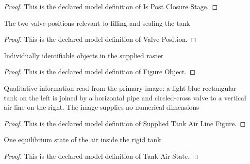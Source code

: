 \begin{proof}
  This is the declared model definition of Is Post Closure Stage.
\end{proof}
\begin{definition}
  \label{def:physics:phyx-mini-0443:phyxminiproblems-problemphyxmini0443-valveposition}
  The two valve positions relevant to filling and sealing the tank
\end{definition}
\begin{proof}
  This is the declared model definition of Valve Position.
\end{proof}
\begin{definition}
  \label{def:physics:phyx-mini-0443:phyxminiproblems-problemphyxmini0443-figureobject}
  Individually identifiable objects in the supplied raster
\end{definition}
\begin{proof}
  This is the declared model definition of Figure Object.
\end{proof}
\begin{definition}
  \label{def:physics:phyx-mini-0443:phyxminiproblems-problemphyxmini0443-suppliedtankairlinefigure}
  Qualitative information read from the primary image: a light-blue rectangular tank on the left is joined by a horizontal pipe and circled-cross valve to a vertical air line on the right. The image supplies no numerical dimensions
\end{definition}
\begin{proof}
  This is the declared model definition of Supplied Tank Air Line Figure.
\end{proof}
\begin{definition}
  \label{def:physics:phyx-mini-0443:phyxminiproblems-problemphyxmini0443-tankairstate}
  One equilibrium state of the air inside the rigid tank
\end{definition}
\begin{proof}
  This is the declared model definition of Tank Air State.
\end{proof}
